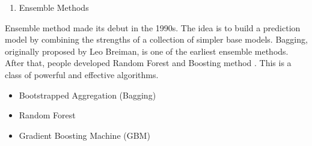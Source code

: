 \documentclass[12pt,]{krantz}
\providecommand{\tightlist}{%
  \setlength{\itemsep}{0pt}\setlength{\parskip}{0pt}}
\theoremstyle{definition}
\theoremstyle{definition}
\theoremstyle{definition}
\theoremstyle{remark}
\begin{document}
\begin{enumerate}
\def\labelenumi{\arabic{enumi}.}
\setcounter{enumi}{12}
\tightlist
\item
  Ensemble Methods
\end{enumerate}

Ensemble method made its debut in the 1990s. The idea is to build a
prediction model by combining the strengths of a collection of simpler
base models. Bagging, originally proposed by Leo Breiman, is one of the
earliest ensemble methods. After that, people developed Random Forest
\citep{Ho1998, amit1997} and Boosting method
\citep{Valiant1984, KV1989}. This is a class of powerful and effective
algorithms.

\begin{itemize}
\tightlist
\item
  Bootstrapped Aggregation (Bagging)
\item
  Random Forest
\item
  Gradient Boosting Machine (GBM)
\end{itemize}
\end{document}
